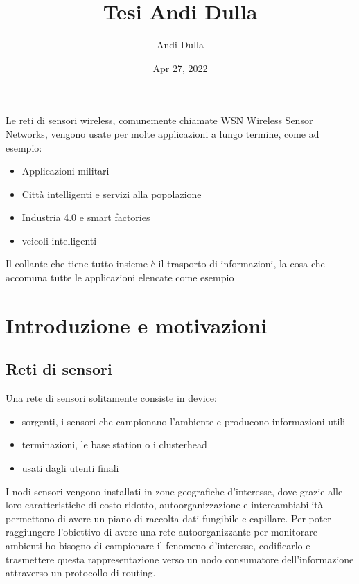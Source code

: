 \documentclass[letterpaper,10pt,english]{jupyterBook}
\title{Tesi Andi Dulla}
\date{Apr 27, 2022}
\author{Andi Dulla}
\begin{document}
\pagestyle{empty}
\sphinxmaketitle
\pagestyle{plain}
\sphinxtableofcontents
\pagestyle{normal}
\label{\detokenize{intro::doc}}


\sphinxAtStartPar
Le reti di sensori wireless, comunemente chiamate WSN Wireless Sensor Networks, vengono usate per molte applicazioni a
lungo termine, come ad esempio:
\begin{itemize}
\item {} 
\sphinxAtStartPar
Applicazioni militari

\item {} 
\sphinxAtStartPar
Città intelligenti e servizi alla popolazione

\item {} 
\sphinxAtStartPar
Industria 4.0 e smart factories

\item {} 
\sphinxAtStartPar
veicoli intelligenti

\end{itemize}

\sphinxAtStartPar
Il collante che tiene tutto insieme è il trasporto di informazioni, la cosa che accomuna tutte le applicazioni elencate
come esempio

\sphinxstepscope


\part{Introduzione e motivazioni}

\sphinxstepscope


\chapter{Reti di sensori}
\label{\detokenize{chapters/sensor:reti-di-sensori}}\label{\detokenize{chapters/sensor::doc}}
\sphinxAtStartPar
Una rete di sensori solitamente consiste in device:
\begin{itemize}
\item {} 
\sphinxAtStartPar
sorgenti, i sensori che campionano l’ambiente e producono informazioni utili

\item {} 
\sphinxAtStartPar
terminazioni, le base station o i clusterhead

\item {} 
\sphinxAtStartPar
usati dagli utenti finali

\end{itemize}

\sphinxAtStartPar
I nodi sensori vengono installati in zone geografiche d’interesse, dove grazie alle loro caratteristiche di costo
ridotto, auto\sphinxhyphen{}organizzazione e intercambiabilità permettono di avere un piano di raccolta dati fungibile e capillare.
Per poter raggiungere l’obiettivo di avere una rete auto\sphinxhyphen{}organizzante per monitorare ambienti ho bisogno di campionare
il fenomeno d’interesse, codificarlo e trasmettere questa rappresentazione verso un nodo consumatore dell’informazione
attraverso un protocollo di routing.
\end{document}
